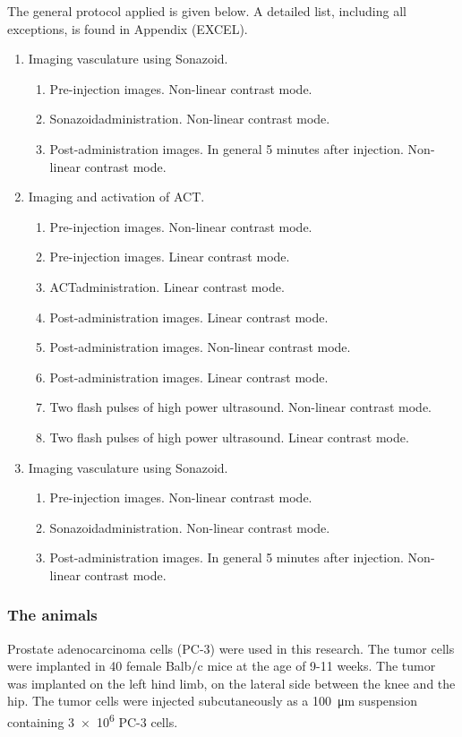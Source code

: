 The general protocol applied is given below\cite{Healey2014}. A detailed list, including all exceptions, is found in Appendix (EXCEL).

\begin{enumerate}
	\item Imaging vasculature using Sonazoid\texttrademark.
		\begin{enumerate}
		\item Pre-injection images. Non-linear contrast mode.
		\item Sonazoid\texttrademark administration. Non-linear contrast mode.
		\item Post-administration images. In general 5 minutes after injection. Non-linear contrast mode.
		\end{enumerate}
	\item Imaging and activation of ACT\texttrademark.
		\begin{enumerate}
		\item Pre-injection images. Non-linear contrast mode.
		\item Pre-injection images. Linear contrast mode.
		\item ACT\texttrademark administration. Linear contrast mode.
		\item Post-administration images. Linear contrast mode.
		\item Post-administration images. Non-linear contrast mode.
		\item Post-administration images. Linear contrast mode.
		\item Two flash pulses of high power ultrasound. Non-linear contrast mode.
		\item Two flash pulses of high power ultrasound. Linear contrast mode.
		\end{enumerate}
	\item Imaging vasculature using Sonazoid\texttrademark.
		\begin{enumerate}
		\item Pre-injection images. Non-linear contrast mode.
		\item Sonazoid\texttrademark administration. Non-linear contrast mode.
		\item Post-administration images. In general 5 minutes after injection. Non-linear contrast mode.
		\end{enumerate}
\end{enumerate}  
 

\subsubsection{The animals}
Prostate adenocarcinoma cells (PC-3) were used in this research. The tumor cells were implanted in 40 female Balb/c mice at the age of 9-11 weeks. The tumor was implanted on the left hind limb, on the lateral side between the knee and the hip. The tumor cells were injected subcutaneously as a \SI{100}{\micro\meter} suspension containing \num{3e6} PC-3 cells.

